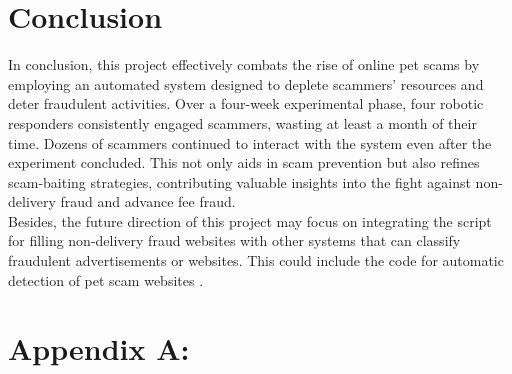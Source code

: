 \documentclass[ oneside,%
                    author={Cassie Qing Tang},
                    degree={BSc},
                     title={An Automated Response System for Disrupting Online Pet Scamming \\ },
                    subtitle={ }]{dissertation}
\begin{document}
\chapter{Conclusion}
In conclusion, this project effectively combats the rise of online pet scams by employing an automated system designed to deplete scammers' resources and deter fraudulent activities. Over a four-week experimental phase, four robotic responders consistently engaged scammers, wasting at least a month of their time. Dozens of scammers continued to interact with the system even after the experiment concluded. This not only aids in scam prevention but also refines scam-baiting strategies, contributing valuable insights into the fight against non-delivery fraud and advance fee fraud.
\\

Besides, the future direction of this project may focus on integrating the script for filling non-delivery fraud websites with other systems that can classify fraudulent advertisements or websites. This could include the code for automatic detection of pet scam websites \cite{mehmedov_automated_2021}.



% 


\appendix

\chapter{Appendix A: }
\label{}
\end{document}
